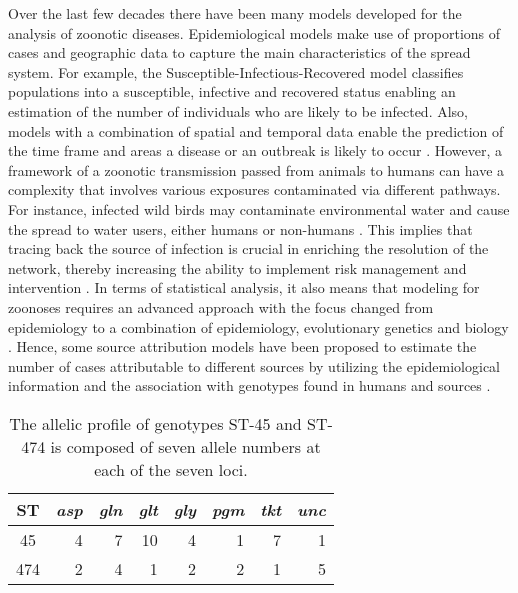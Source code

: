 \documentclass[times, doublespace]{WileyNJD-v2}%
\begin{document}
Over the last few decades there have been many models developed for the analysis of zoonotic diseases. Epidemiological models make use of proportions of cases and geographic data to capture the main characteristics of the spread system. For example, the Susceptible-Infectious-Recovered model \cite{Kerm} classifies populations into a susceptible, infective and recovered status enabling an estimation of the number of individuals who are likely to be infected. Also, models with a combination of spatial and temporal data enable the prediction of the time frame and areas a disease or an outbreak is likely to occur \cite{HeldL, Hoehl, Simo}. However, a framework of a zoonotic transmission passed from animals to humans can have a complexity that involves various exposures contaminated via different pathways. For instance, infected wild birds may contaminate environmental water and cause the spread to water users, either humans or non-humans \cite{Wagen}. This implies that tracing back the source of infection is crucial in enriching the resolution of the network, thereby increasing the ability to implement risk management and intervention \cite{Wilso, Morel}. In terms of statistical analysis, it also means that modeling for zoonoses requires an advanced approach with the focus changed from epidemiology to a combination of epidemiology, evolutionary genetics and biology \cite{Muell}. Hence, some source attribution models have been proposed to estimate the number of cases attributable to different sources by utilizing the epidemiological information and the association with genotypes found in humans and sources \cite{vanP, Hald, MullA}. 

\begin{table}
  \begin{center}
    \begin{tabular}{crrrrrrr}
      \toprule
      ST & \textit{asp} & \textit{gln} & \textit{glt} & \textit{gly} & \textit{pgm}& \textit{tkt}& \textit{unc}\\ \midrule
      45  & 4 & 7 & 10 & 4 & 1 & 7 & 1\\
      474 & 2 & 4 & 1 & 2 & 2 & 1 & 5 \\
      \bottomrule
    \end{tabular}
  \end{center}
  \caption{The allelic profile of genotypes ST-45 and ST-474 is composed of seven allele numbers at each of the seven loci.}
  \label{tab0}
\end{table}
\end{document}
